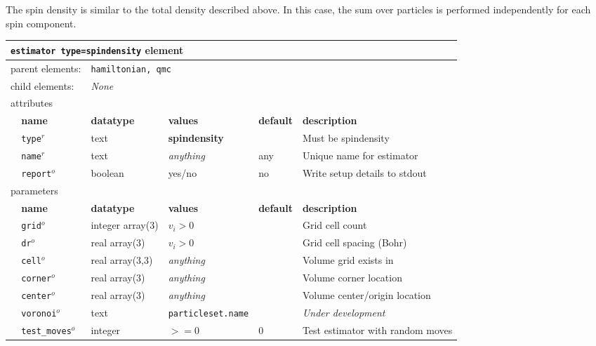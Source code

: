 The spin density is similar to the total density described above.  In this case, the sum over particles is performed independently for each spin component.

\FloatBarrier
\begin{table}[h]
\begin{center}
\begin{tabularx}{\textwidth}{l l l l l l }
\hline
\multicolumn{6}{l}{\texttt{estimator type=spindensity} element} \\
\hline
\multicolumn{2}{l}{parent elements:} & \multicolumn{4}{l}{\texttt{hamiltonian, qmc}}\\
\multicolumn{2}{l}{child  elements:} & \multicolumn{4}{l}{\textit{None}}\\
\multicolumn{2}{l}{attributes}  & \multicolumn{4}{l}{}\\
   & \bfseries name       & \bfseries datatype & \bfseries values  & \bfseries default   & \bfseries description \\
   & \texttt{type}$^r$    &  text              & \textbf{spindensity} &                  & Must be spindensity       \\
   & \texttt{name}$^r$    &  text              & \textit{anything}    & any              & Unique name for estimator \\
   & \texttt{report}$^o$  &  boolean           & yes/no               & no               & Write setup details to stdout \\
\multicolumn{2}{l}{parameters}  & \multicolumn{4}{l}{}\\
   & \bfseries name       & \bfseries datatype & \bfseries values  & \bfseries default   & \bfseries description \\
   & \texttt{grid}$^o$      & integer array(3) & $v_i>0$           &                     & Grid cell count       \\
   & \texttt{dr}$^o$        & real array(3)    & $v_i>0$           &                     & Grid cell spacing (Bohr) \\
   & \texttt{cell}$^o$      & real array(3,3)  & \textit{anything} &                     & Volume grid exists in           \\
   & \texttt{corner}$^o$    & real array(3)    & \textit{anything} &                     & Volume corner location  \\
   & \texttt{center}$^o$    & real array(3)    & \textit{anything} &                     & Volume center/origin location \\
   & \texttt{voronoi}$^o$   & text             &\texttt{particleset.name}&               & \textit{Under development}\\%
   & \texttt{test\_moves}$^o$& integer         & $>=0$             & 0                   & Test estimator with random moves  \\
  \hline
\end{tabularx}
\end{center}
\end{table}
\FloatBarrier


